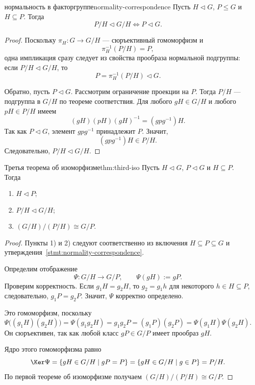 \begin{Statement}{нормальность в факторгруппе}{normality-correspondence}
	Пусть $H\triangleleft G$, $P\le G$ и $H\subseteq P$. Тогда
	\[
	P/H \triangleleft G/H \Longleftrightarrow P \triangleleft G.
	\]
\end{Statement}

\begin{proof}
	Поскольку $\pi_H\colon G\to G/H$ --- сюръективный гомоморфизм и
	\[
	\pi_H^{-1}(P/H)=P,
	\]
	одна импликация сразу следует из свойства прообраза нормальной подгруппы:
	если $P/H\triangleleft G/H$, то
	\[
	P=\pi_H^{-1}(P/H)\triangleleft G.
	\]
	
	Обратно, пусть $P\triangleleft G$. Рассмотрим ограничение проекции на $P$. Тогда $P/H$ --- подгруппа в $G/H$ по теореме соответствия. Для любого $gH\in G/H$ и любого $pH\in P/H$ имеем
	\[
	(gH)(pH)(gH)^{-1}=(gpg^{-1})H.
	\]
	Так как $P\triangleleft G$, элемент $gpg^{-1}$ принадлежит $P$. Значит,
	\[
	(gpg^{-1})H\in P/H.
	\]
	Следовательно, $P/H\triangleleft G/H$.
\end{proof}

\begin{Theorem}{Третья теорема об изоморфизме}{thm:third-iso}
	Пусть $H\triangleleft G$, $P\triangleleft G$ и $H\subseteq P$. Тогда
	\begin{enumerate}
		\item $H\triangleleft P$;
		\item $P/H\triangleleft G/H$;
		\item $(G/H)/(P/H) \cong G/P.$

	\end{enumerate}
\end{Theorem}

\begin{proof}
	Пункты 1) и 2) следуют соответственно из включения $H\subseteq P\subseteq G$ и утверждения~\ref{stmt:normality-correspondence}.
	
	Определим отображение
	\[
	\Psi\colon G/H \to G/P, \qquad \Psi(gH):=gP.
	\]
	Проверим корректность. Если $g_1H=g_2H$, то $g_2=g_1h$ для некоторого $h\in H\subseteq P$, следовательно, $g_1P=g_2P.$
	Значит, $\Psi$ корректно определено.
	
	Это гомоморфизм, поскольку
	\[
	\Psi\bigl((g_1H)(g_2H)\bigr)=\Psi(g_1g_2H)=g_1g_2P=(g_1P)(g_2P)=\Psi(g_1H)\Psi(g_2H).
	\]
	Он сюръективен, так как любой класс $gP\in G/P$ имеет прообраз $gH$.
	
	Ядро этого гомоморфизма равно
	\[
	\Ker\Psi=\{gH\in G/H\mid gP=P\}=\{gH\in G/H\mid g\in P\}=P/H.
	\]
	По первой теореме об изоморфизме получаем $(G/H)/(P/H)\cong G/P.$
\end{proof}
